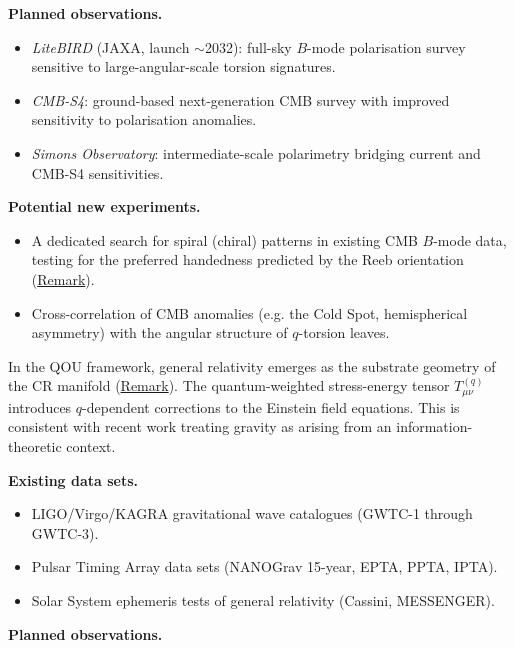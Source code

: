\textbf{Planned observations.}

\begin{itemize}
  \item \emph{LiteBIRD} (JAXA, launch $\sim$2032): full-sky $B$-mode polarisation survey sensitive to large-angular-scale torsion signatures.
  \item \emph{CMB-S4}: ground-based next-generation CMB survey with improved sensitivity to polarisation anomalies.
  \item \emph{Simons Observatory}: intermediate-scale polarimetry bridging current and CMB-S4 sensitivities.
\end{itemize}

\textbf{Potential new experiments.}

\begin{itemize}
  \item A dedicated search for spiral (chiral) patterns in existing CMB $B$-mode data, testing for the preferred handedness predicted by the Reeb orientation (\hyperref[rem:descartes-chirality]{Remark}).
  \item Cross-correlation of CMB anomalies (e.g. the Cold Spot, hemispherical asymmetry) with the angular structure of $q$-torsion leaves.
\end{itemize}

\begin{remark}
  \label{rem:gravity-emergent}
In the QOU framework, general relativity emerges as the substrate geometry of
the CR manifold (\hyperref[rem:gr-substrate-geometry]{Remark}). The quantum-weighted
stress-energy tensor $T_{\mu\nu}^{(q)}$ introduces $q$-dependent corrections
to the Einstein field equations. This is consistent with recent work treating
gravity as arising from an information-theoretic context.
\end{remark}

\textbf{Existing data sets.}

\begin{itemize}
  \item LIGO/Virgo/KAGRA gravitational wave catalogues (GWTC-1 through GWTC-3).
  \item Pulsar Timing Array data sets (NANOGrav 15-year, EPTA, PPTA, IPTA).
  \item Solar System ephemeris tests of general relativity (Cassini, MESSENGER).
\end{itemize}

\textbf{Planned observations.}

